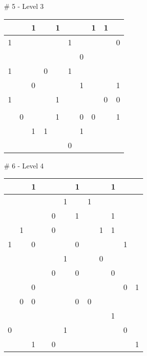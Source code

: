 \medskip

\# 5 - Level 3 \newline
\begin{tabular}{|m{\collen}|m{\collen}|m{\collen}|m{\collen}|m{\collen}|m{\collen}|m{\collen}|m{\collen}|m{\collen}|m{\collen}|}
\hline
    &   & 1 &   & 1 &   &   & 1 & 1 &   \\
\hline
  1 &   &   &   &   & 1 &   &   &   & 0 \\
\hline
    &   &   &   &   &   & 0 &   &   &   \\
\hline
  1 &   &   & 0 &   & 1 &   &   &   &   \\
\hline
    &   & 0 &   &   &   & 1 &   &   & 1 \\
\hline
  1 &   &   &   & 1 &   &   &   & 0 & 0 \\
\hline
    &   &   &   &   &   &   &   &   &   \\
\hline
    & 0 &   &   & 1 &   & 0 & 0 &   & 1 \\
\hline
    &   & 1 & 1 &   &   & 1 &   &   &   \\
\hline
    &   &   &   &   & 0 &   &   &   &   \\
\hline
\end{tabular}


\medskip

\# 6 - Level 4 \newline
\begin{tabular}{|m{\collen}|m{\collen}|m{\collen}|m{\collen}|m{\collen}|m{\collen}|m{\collen}|m{\collen}|m{\collen}|m{\collen}|m{\collen}|m{\collen}|}
\hline
    &   & 1 &   &   &   & 1 &   &   & 1 &   &   \\
\hline
    &   &   &   &   & 1 &   & 1 &   &   &   &   \\
\hline
    &   &   &   & 0 &   & 1 &   &   & 1 &   &   \\
\hline
    & 1 &   &   & 0 &   &   &   & 1 & 1 &   &   \\
\hline
  1 &   & 0 &   &   &   & 0 &   &   &   & 1 &   \\
\hline
    &   &   &   &   & 1 &   &   & 0 &   &   &   \\
\hline
    &   &   &   & 0 &   & 0 &   &   & 0 &   &   \\
\hline
    &   & 0 &   &   &   &   &   &   &   & 0 & 1 \\
\hline
    & 0 & 0 &   &   &   & 0 & 0 &   &   &   &   \\
\hline
    &   &   &   &   &   &   &   &   & 1 &   &   \\
\hline
  0 &   &   &   &   & 1 &   &   &   &   & 0 &   \\
\hline
    &   & 1 &   & 0 &   &   &   &   &   &   & 1 \\
\hline
\end{tabular}


